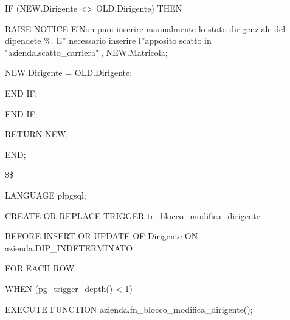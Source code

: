\begin{flushleft}
\begin{description}
\begin{description}
\begin{description}
                            \item IF (NEW.Dirigente <> OLD.Dirigente) THEN
                            \begin{description}
                                \item RAISE NOTICE E'Non puoi inserire manualmente lo stato dirigenziale del dipendete \%. E'' necessario inserire l''apposito scatto in "azienda.scatto\_carriera"', NEW.Matricola;
                                \item NEW.Dirigente = OLD.Dirigente;
                            \end{description}
                            END IF;
                        \end{description}
                        \item END IF;
                        
                        \item RETURN NEW;
                    \end{description}
                    \item END;
                    \item \$\$
                    \item LANGUAGE plpgsql;
                \end{description}
            \end{flushleft}
        \normalfont

        \ttfamily
            \begin{flushleft}
                \begin{description}
                    \item CREATE OR REPLACE TRIGGER tr\_blocco\_modifica\_dirigente
                    \item BEFORE INSERT OR UPDATE OF Dirigente ON azienda.DIP\_INDETERMINATO
                    \item FOR EACH ROW
                    \item WHEN (pg\_trigger\_depth() < 1)
                    \item EXECUTE FUNCTION azienda.fn\_blocco\_modifica\_dirigente();
                \end{description}
            \end{flushleft}
        \normalfont

\newpage

